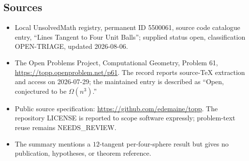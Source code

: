 \documentclass[11pt]{article}
\begin{document}
\subsection{Sources}
\begin{itemize}
\item Local UnsolvedMath registry, permanent ID 5500061, source code catalogue entry, ``Lines Tangent to Four Unit Balls''; supplied status open, classification OPEN-TRIAGE, updated 2026-08-06.
\item The Open Problems Project, Computational Geometry, Problem 61, \url{https://topp.openproblem.net/p61}. The record reports source-TeX extraction and access on 2026-07-29; the maintained entry is described as ``Open, conjectured to be $\Omega(n^3)$.''
\item Public source specification: \url{https://github.com/edemaine/topp}. The repository LICENSE is reported to scope software expressly; problem-text reuse remains NEEDS\_REVIEW.
\item The summary mentions a $12$-tangent per-four-sphere result but gives no publication, hypotheses, or theorem reference.
\end{itemize}
\end{document}
